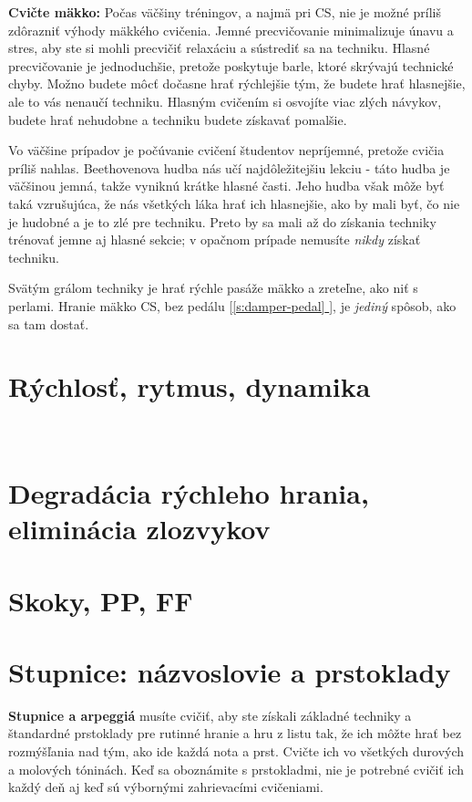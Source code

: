 \documentclass[11pt,a4paper]{book}
\newcommand*{\fullref}[1]{\hyperref[{#1}]{\ref*{#1} \nameref*{#1}}} %
\newcommand*{\fullrefp}[1]{[\fullref{#1}]} %
\begin{document}
\textbf{Cvičte mäkko:} Počas väčšiny tréningov, a najmä pri CS, nie je možné príliš zdôrazniť výhody mäkkého cvičenia. Jemné precvičovanie minimalizuje únavu a stres, aby ste si mohli precvičiť relaxáciu a sústrediť sa na techniku. Hlasné precvičovanie je jednoduchšie, pretože poskytuje barle, ktoré skrývajú technické chyby. Možno budete môcť dočasne hrať rýchlejšie tým, že budete hrať hlasnejšie, ale to vás nenaučí techniku. Hlasným cvičením si osvojíte viac zlých návykov, budete hrať nehudobne a techniku budete získavať pomalšie.

Vo väčšine prípadov je počúvanie cvičení študentov nepríjemné, pretože cvičia príliš nahlas. Beethovenova hudba nás učí najdôležitejšiu lekciu - táto hudba je väčšinou jemná, takže vyniknú krátke hlasné časti. Jeho hudba však môže byť taká vzrušujúca, že nás všetkých láka hrať ich hlasnejšie, ako by mali byť, čo nie je hudobné a je to zlé pre techniku. Preto by sa mali až do získania techniky trénovať jemne aj hlasné sekcie; v opačnom prípade nemusíte \emph{nikdy} získať techniku.

Svätým grálom techniky je hrať rýchle pasáže mäkko a zreteľne, ako niť s perlami. Hranie mäkko CS, bez pedálu \fullrefp{s:damper-pedal}, je \emph{jediný} spôsob, ako sa tam dostať.

\section{Rýchlosť, rytmus, dynamika}\label{s:speed}
\ 
\section{Degradácia rýchleho hrania, eliminácia zlozvykov}\label{s:fast-degradation}

\section{Skoky, PP, FF}\label{s:jumps}

\section{Stupnice: názvoslovie a prstoklady}\label{s:scales}
\textbf{Stupnice a arpeggiá} musíte cvičiť, aby ste získali základné techniky a štandardné prstoklady pre rutinné hranie a hru z listu tak, že ich môžte hrať bez rozmýšľania nad tým, ako ide každá nota a prst. Cvičte ich vo všetkých durových a molových tóninách. Keď sa oboznámite s prstokladmi, nie je potrebné cvičiť ich každý deň aj keď sú výbornými zahrievacími cvičeniami.
\end{document}
